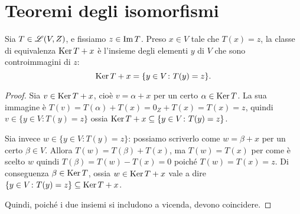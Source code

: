 \section{Teoremi degli isomorfismi}
\begin{teorema}
	Sia $T\in\mathscr L(V,Z)$, e fissiamo $z\in \operatorname{Im} T$.
	Preso $x\in V$ tale che $T(x)=z$, la classe di equivalenza $\operatorname{Ker} T+x$ è l'insieme degli elementi $y$ di $V$ che sono controimmagini di $z$:
	\begin{equation*}
		 \operatorname{Ker} T+x=\{y\in V\colon T(y)=z\}.
	\end{equation*}
\end{teorema}
\begin{proof}
	Sia $v\in\operatorname{Ker} T+x$, cioè $v=\alpha+x$ per un certo $\alpha\in\operatorname{Ker} T$.
	La sua immagine è $T(v)=T(\alpha)+T(x)=0_Z+T(x)=T(x)=z$, quindi $v\in\{y\in V\colon T(y)=z\}$ ossia $\operatorname{Ker} T+x\subseteq\{y\in V\colon T(y)=z\}$.

	Sia invece $w\in\{y\in V\colon T(y)=z\}$: possiamo scriverlo come $w=\beta+x$ per un certo $\beta\in V$.
	Allora $T(w)=T(\beta)+T(x)$, ma $T(w)=T(x)$ per come è scelto $w$ quindi $T(\beta)=T(w)-T(x)=0$ poich\'e $T(w)=T(x)=z$.
	Di conseguenza $\beta\in\operatorname{Ker} T$, ossia $w\in\operatorname{Ker} T+x$ vale a dire $\{y\in V\colon T(y)=z\}\subseteq\operatorname{Ker} T+x$.

	Quindi, poiché i due insiemi si includono a vicenda, devono coincidere.
\end{proof}


